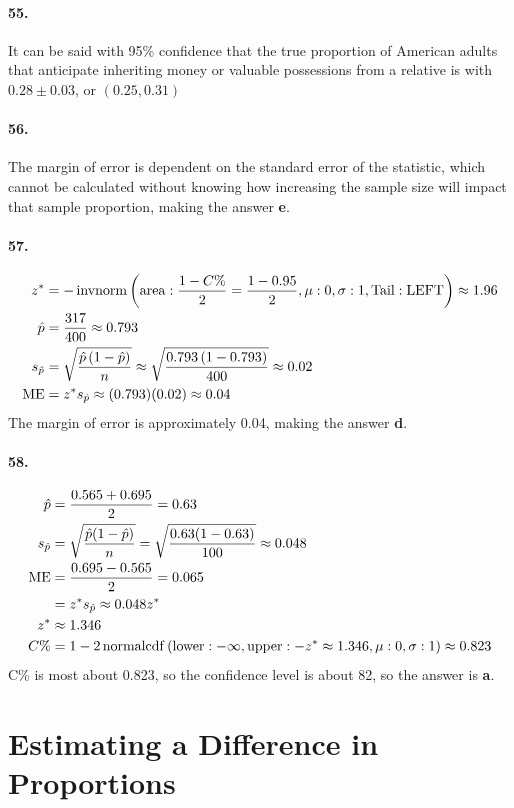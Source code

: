 		\paragraph{55.}
			It can be said with 95\% confidence that the true proportion of American adults that anticipate inheriting money or valuable possessions from a relative is with $0.28 \pm 0.03$, or $(0.25, 0.31)$
		\paragraph{56.}
			The margin of error is dependent on the standard error of the statistic, which cannot be calculated without knowing how increasing the sample size will impact that sample proportion, making the answer \textbf{e}.
		\paragraph{57.}
			\begin{align*}
				z^* &= -\operatorname{invnorm}\left(\operatorname{area}:\frac{1 - C\%}{2} = \frac{1 - 0.95}{2}, \mu: 0, \sigma: 1, \mathrm{Tail: LEFT}\right) \approx 1.96 \\
				\hat{p} &= \frac{317}{400} \approx 0.793 \\
				s_{\hat{p}} &= \sqrt{\frac{\hat{p}\left(1 - \hat{p}\right)}{n}} \approx \sqrt{\frac{0.793\left(1 - 0.793\right)}{400}} \approx 0.02  \\
				\operatorname{ME} &= z^*s_{\hat{p}} \approx (0.793)(0.02) \approx 0.04
			\end{align*}
			The margin of error is approximately 0.04, making the answer \textbf{d}.
		\paragraph{58.}
			\begin{align*}
				\hat{p} &= \frac{0.565 + 0.695}{2} = 0.63 \\
				s_{\hat{p}} &= \sqrt{\frac{\hat{p}(1 - \hat{p})}{n}} = \sqrt{\frac{0.63(1 - 0.63)}{100}} \approx 0.048 \\
				\operatorname{ME} &= \frac{0.695 - 0.565}{2} = 0.065 \\
					&= z^*s_{\hat{p}} \approx 0.048z^* \\ 
				z^* &\approx 1.346 \\
				C\% &= 1 - 2\operatorname{normalcdf}\left(\operatorname{lower}: -\infty, \operatorname{upper}: -z^* \approx 1.346, \mu: 0, \sigma: 1\right) \approx 0.823
			\end{align*}
			C\% is most about 0.823, so the confidence level is about 82, so the answer is \textbf{a}.
	\section{Estimating a Difference in Proportions}
